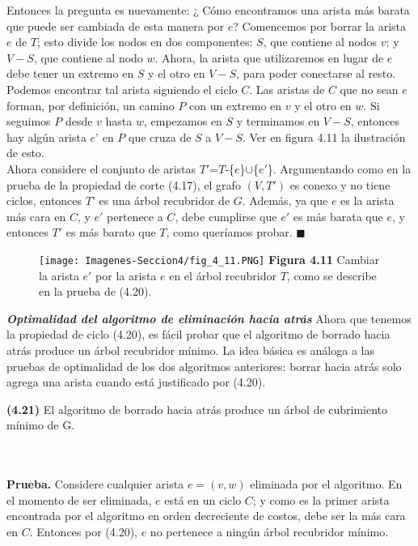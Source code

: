 \documentclass[a4paper]{article}
\begin{document}
Entonces la pregunta es nuevamente: ¿ Cómo encontramos una arista más barata que puede ser cambiada de esta manera por $e$? Comencemos por borrar la arista $e$ de $T$; esto divide los nodos en dos componentes: $S$, que contiene al nodos $v$; y $V-S$, que contiene al nodo $w$. Ahora, la arista que utilizaremos en lugar de $e$ debe tener un extremo en $S$ y el otro en $V-S$, para poder conectarse al resto.\\
    
Podemos encontrar tal arista siguiendo el ciclo $C$. Las aristas de $C$ que no sean $e$ forman, por definición, un camino $P$  con un extremo en $v$ y el otro en $w$. Si seguimos $P$ desde $v$ hasta $w$, empezamos en $S$ y terminamos en $V-S$, entonces hay algún arista $e$' en $P$ que cruza de $S$ a $V-S$. Ver en figura 4.11 la ilustración de esto.\\

Ahora considere el conjunto de aristas $T'$=$T$-\{$e$\}\(\cup\)\{$e'$\}. Argumentando como en la prueba de la propiedad de corte (4.17), el grafo $(V,T')$ es conexo y no tiene ciclos, entonces $T$' es una árbol recubridor de $G$. Además, ya que $e$ es la arista más cara en $C$, y $e'$ pertenece a $C$, debe cumplirse que $e'$ es más barata que $e$, y entonces $T'$ es más barato que $T$, como queríamos probar. \(\blacksquare\)\\
    
\begin{figure}[h]
\centering
\texttt{[image: Imagenes-Seccion4/fig\_4\_11.PNG]}
\textbf{Figura 4.11} Cambiar la arista $e'$ por la arista $e$ en el árbol recubridor $T$, como se describe en la prueba de (4.20).
\end{figure}

\textbf{\textit{Optimalidad del algoritmo de eliminación hacia atrás}} Ahora que tenemos la propiedad de ciclo (4.20), es fácil probar que el algoritmo de borrado hacia atrás produce un árbol recubridor mínimo. La idea básica es análoga a las pruebas de optimalidad de los dos algoritmos anteriores: borrar hacia atrás solo agrega una arista cuando está justificado por (4.20).\\

\colorbox{mygray}{\parbox{15cm}{
\textbf{(4.21)}  El algoritmo de borrado hacia atrás produce un árbol de cubrimiento mínimo de G.}}\\\\

\textbf{Prueba.} Considere cualquier arista $e=(v,w)$ eliminada por el algoritmo. En el momento de ser eliminada, $e$ está en un ciclo $C$; y como es la primer arista encontrada por el algoritmo en orden decreciente de costos, debe ser la más cara en $C$. Entonces por (4.20), $e$ no pertenece a ningún árbol recubridor mínimo.\\
\end{document}
